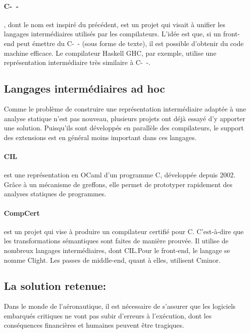 \paragraph{C-~-}\cite{spjcmm} , dont le nom est inspiré du précédent,
est un projet qui visait à unifier les langages intermédiaires utilisés par les
compilateurs. L'idée est que, si un front-end peut émettre du C-~- (sous forme de
texte), il est possible d'obtenir du code machine efficace. Le compilateur
Haskell GHC, par exemple, utilise une représentation intermédiaire très
similaire à C-~-.

\subsection*{Langages intermédiaires ad hoc}

Comme le problème de construire une représentation intermédiaire adaptée à une
analyse statique n'est pas nouveau, plusieurs projets ont déjà essayé d'y
apporter une solution. Puisqu'ils sont développés en parallèle des compilateurs,
le support des extensions est en général moins important dans ces langages.

\paragraph{CIL}\cite{NeculaCil}  est une représentation en
OCaml d'un programme C, développée depuis 2002. Grâce à un mécanisme de
greffons, elle permet de prototyper rapidement des analyses statiques de
programmes.

\paragraph{CompCert} est un projet qui vise à produire un compilateur certifié
pour C. C'est-à-dire que les transformations sémantiques sont faites de manière
prouvée. Il utilise de nombreux langages intermédiaires, dont CIL.\@ Pour le
front-end, le langage se nomme Clight\cite{cfront}. Les passes de middle-end,
quant à elles, utilisent Cminor\cite{cminorSL}.

\subsection*{La solution retenue: \langname{}}

Dans le monde de l'aéronautique, il est nécessaire de s'assurer que les
logiciels embarqués critiques ne vont pas subir d'erreurs à l'exécution, dont
les conséquences financières et humaines peuvent être tragiques.

